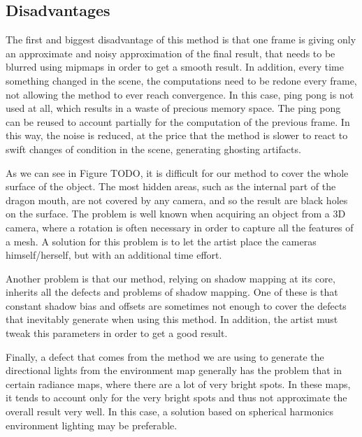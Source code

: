 \subsection{Disadvantages}
The first and biggest disadvantage of this method is that one frame is giving only an approximate and noisy approximation of the final result, that needs to be blurred using mipmaps in order to get a smooth result. In addition, every time something changed in the scene, the computations need to be redone every frame, not allowing the method to ever reach convergence. In this case, ping pong is not used at all, which results in a waste of precious memory space. The ping pong can be reused to account partially for the computation of the previous frame. In this way, the noise is reduced, at the price that the method is slower to react to swift changes of condition in the scene, generating ghosting artifacts.

As we can see in Figure TODO, it is difficult for our method to cover the whole surface of the object. The most hidden areas, such as the internal part of the dragon mouth, are not covered by any camera, and so the result are black holes on the surface. The problem is well known when acquiring an object from a 3D camera, where a rotation is often necessary in order to capture all the features of a mesh. A solution for this problem is to let the artist place the cameras himself/herself, but with an additional time effort. 

Another problem is that our method, relying on shadow mapping at its core, inherits all the defects and problems of shadow mapping. One of these is that constant shadow bias and offsets are sometimes not enough to cover the defects that inevitably generate when using this method. In addition, the artist must tweak this parameters in order to get a good result.  

Finally, a defect that comes from the method we are using to generate the directional lights from the environment map generally has the problem that in certain radiance maps, where there are a lot of very bright spots. In these maps, it tends to account only for the very bright spots and thus not approximate the overall result very well. In this case, a solution based on spherical harmonics \citep{peterpikeconference} environment lighting may be preferable.
